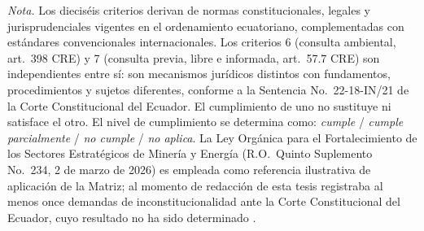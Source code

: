 \noindent\textit{Nota.} Los dieciséis criterios derivan de normas constitucionales, legales y jurisprudenciales vigentes en el ordenamiento ecuatoriano, complementadas con estándares convencionales internacionales. Los criterios 6 (consulta ambiental, art.\ 398 CRE) y 7 (consulta previa, libre e informada, art.\ 57.7 CRE) son independientes entre sí: son mecanismos jurídicos distintos con fundamentos, procedimientos y sujetos diferentes, conforme a la Sentencia No.\ 22-18-IN/21 de la Corte Constitucional del Ecuador. El cumplimiento de uno no sustituye ni satisface el otro. El nivel de cumplimiento se determina como: \textit{cumple} / \textit{cumple parcialmente} / \textit{no cumple} / \textit{no aplica}. La Ley Orgánica para el Fortalecimiento de los Sectores Estratégicos de Minería y Energía (R.O.\ Quinto Suplemento No.\ 234, 2 de marzo de 2026) es empleada como referencia ilustrativa de aplicación de la Matriz; al momento de redacción de esta tesis registraba al menos once demandas de inconstitucionalidad ante la Corte Constitucional del Ecuador, cuyo resultado no ha sido determinado \parencite{primicias_demandas_2026}.
